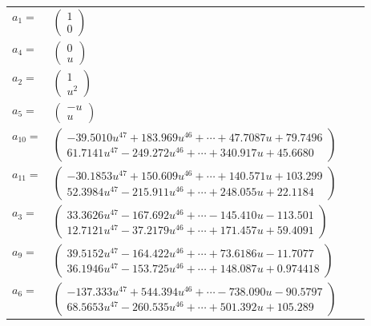 \documentclass[1p]{elsarticle_modified}
\theoremstyle{definition}
\begin{document}
\begin{tabular}{m{7pt} m{180pt} m{7pt} m{180pt} }
\flushright $a_{1}=$&$\begin{pmatrix}1\\0\end{pmatrix}$ \\
\flushright $a_{4}=$&$\begin{pmatrix}0\\u\end{pmatrix}$ \\
\flushright $a_{2}=$&$\begin{pmatrix}1\\u^2\end{pmatrix}$ \\
\flushright $a_{5}=$&$\begin{pmatrix}- u\\u\end{pmatrix}$ \\
\flushright $a_{10}=$&$\begin{pmatrix}-39.5010 u^{47}+183.969 u^{46}+\cdots+47.7087 u+79.7496\\61.7141 u^{47}-249.272 u^{46}+\cdots+340.917 u+45.6680\end{pmatrix}$ \\
\flushright $a_{11}=$&$\begin{pmatrix}-30.1853 u^{47}+150.609 u^{46}+\cdots+140.571 u+103.299\\52.3984 u^{47}-215.911 u^{46}+\cdots+248.055 u+22.1184\end{pmatrix}$ \\
\flushright $a_{3}=$&$\begin{pmatrix}33.3626 u^{47}-167.692 u^{46}+\cdots-145.410 u-113.501\\12.7121 u^{47}-37.2179 u^{46}+\cdots+171.457 u+59.4091\end{pmatrix}$ \\
\flushright $a_{9}=$&$\begin{pmatrix}39.5152 u^{47}-164.422 u^{46}+\cdots+73.6186 u-11.7077\\36.1946 u^{47}-153.725 u^{46}+\cdots+148.087 u+0.974418\end{pmatrix}$ \\
\flushright $a_{6}=$&$\begin{pmatrix}-137.333 u^{47}+544.394 u^{46}+\cdots-738.090 u-90.5797\\68.5653 u^{47}-260.535 u^{46}+\cdots+501.392 u+105.289\end{pmatrix}$ \\

\end{tabular}
\end{document}
